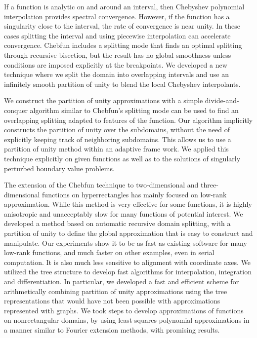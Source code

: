 
If a function is analytic on and around an interval, then Chebyshev polynomial
interpolation provides spectral convergence. However, if the function has a singularity close to the interval, the rate of convergence is near unity. In these cases splitting the interval and using piecewise interpolation can accelerate convergence. Chebfun includes a splitting mode that finds an optimal splitting through recursive bisection, but the result has no global smoothness unless conditions are imposed explicitly at the breakpoints. We developed a new technique where we split the domain into overlapping intervals
and use an infinitely smooth partition of unity to blend the local Chebyshev interpolants. 

We construct the partition of unity approximations with a simple divide-and-conquer algorithm similar to Chebfun’s splitting mode can be used to find an overlapping splitting adapted to features of the function. Our algorithm implicitly constructs the partition of unity over the subdomains, without the need of explicitly keeping track of neighboring subdomains. This allows us to use a partition of unity method within an adaptive frame work. We applied this technique explicitly on given functions as well as to the solutions of singularly perturbed boundary value problems.

The extension of the Chebfun technique to two-dimensional and three-dimensional functions on hyperrectangles has mainly focused on low-rank approximation. While this method is very effective for some functions, it is highly anisotropic and unacceptably slow for many functions of potential interest. We developed a method based on automatic recursive domain splitting, with a partition of unity to define the global approximation that is easy to construct and manipulate. Our experiments show it to be as fast as existing software for many low-rank functions, and much faster on other examples, even in serial computation. It is also much less sensitive to alignment with coordinate axes. We utilized the tree structure to develop fast algorithms for interpolation, integration and differentiation. In particular, we developed a fast and efficient scheme for arithmetically combining partition of unity approximations using the tree representations that would have not been possible with approximations represented with graphs. We took steps to develop approximations of functions on nonrectangular domains, by using least-squares polynomial approximations in a manner similar to Fourier extension methods, with promising results. 

